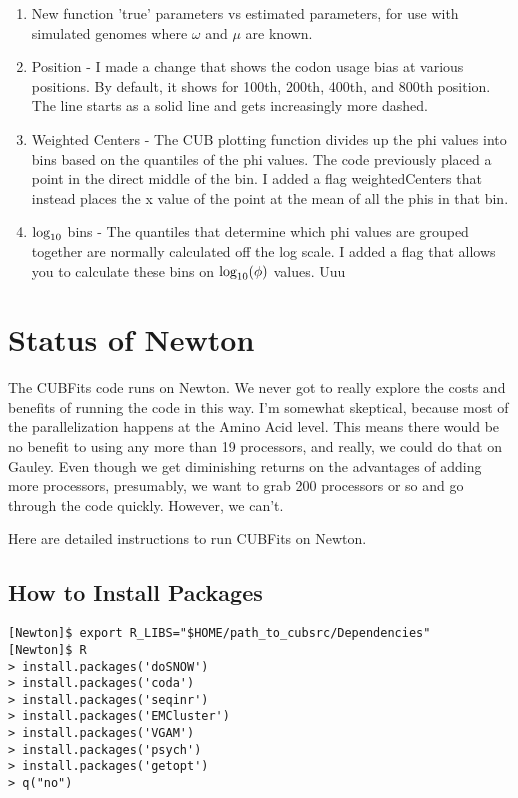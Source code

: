 \begin{enumerate}
\item New function 'true' parameters vs estimated parameters, for use with simulated genomes where $\omega$ and $\mu$ are known. 
\item Position - I made a change that shows the codon usage bias at various positions. By default, it shows for 100th, 200th, 400th, and 800th position. The line starts as a solid line and gets increasingly more dashed.
\item Weighted Centers - The CUB plotting function divides up the phi values into bins based on the quantiles of the phi values. The code previously placed a point in the direct middle of the bin. I added a flag weightedCenters that instead places the x value of the point at the mean of all the phis in that bin.
\item $\hbox{log}_{10}$ bins - The quantiles that determine which phi values are grouped together are normally calculated off the log scale. I added a flag that allows you to calculate these bins on $\hbox{log}_{10}(\phi)$ values.
Uuu
\end{enumerate}



\section{Status of Newton}

The CUBFits code runs on Newton. We never got to really explore the costs and benefits of running the code in this way. I'm somewhat skeptical, because most of the parallelization happens at the Amino Acid level. This means there would be no benefit to using any more than 19 processors, and really, we could do that on Gauley. Even though we get diminishing returns on the advantages of adding more processors, presumably, we want to grab 200 processors or so and go through the code quickly. However, we can't.

Here are detailed instructions to run CUBFits on Newton.

\subsection{How to Install Packages}

\begin{verbatim}
[Newton]$ export R_LIBS="$HOME/path_to_cubsrc/Dependencies"
[Newton]$ R
> install.packages('doSNOW')
> install.packages('coda')
> install.packages('seqinr')
> install.packages('EMCluster')
> install.packages('VGAM')
> install.packages('psych')
> install.packages('getopt')
> q("no")
\end{verbatim}

